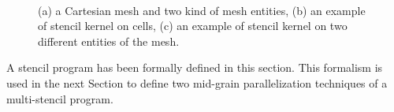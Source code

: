 \begin{figure}
\begin{center}
\\
\hspace{10pt}
\vspace{20pt}
\end{center}
\caption{(a) a Cartesian mesh and two kind of mesh entities, (b) an example of stencil kernel on cells, (c) an example of stencil kernel on two different entities of the mesh.}
\label{fig:gspmsp}
\end{figure}

A stencil program has been formally defined in this section. This formalism is used in the next Section to define two mid-grain parallelization techniques of a multi-stencil program.


